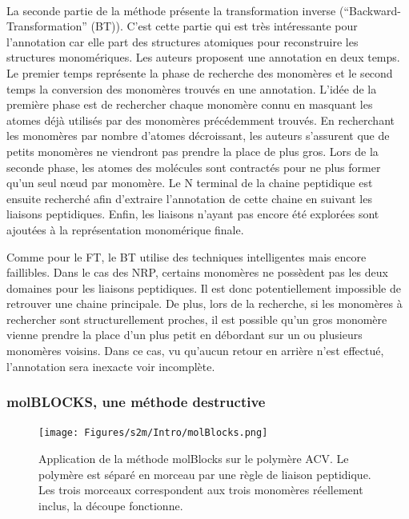 \documentclass[12pt,french,twoside]{report}
\begin{document}
\paragraph{}La seconde partie de la méthode présente la transformation inverse (``Backward-Transformation'' (BT)).
C'est cette partie qui est très intéressante pour l'annotation car elle part des structures atomiques pour reconstruire les structures monomériques.
Les auteurs proposent une annotation en deux temps.
Le premier temps représente la phase de recherche des monomères et le second temps la conversion des monomères trouvés en une annotation.
L'idée de la première phase est de rechercher chaque monomère connu en masquant les atomes déjà utilisés par des monomères précédemment trouvés.
En recherchant les monomères par nombre d'atomes décroissant, les auteurs s'assurent que de petits monomères ne viendront pas prendre la place de plus gros.
Lors de la seconde phase, les atomes des molécules sont contractés pour ne plus former qu'un seul n\oe{}ud par monomère.
Le N terminal de la chaine peptidique est ensuite recherché afin d'extraire l'annotation de cette chaine en suivant les liaisons peptidiques.
Enfin, les liaisons n'ayant pas encore été explorées sont ajoutées à la représentation monomérique finale.

Comme pour le FT, le BT utilise des techniques intelligentes mais encore faillibles.
Dans le cas des NRP, certains monomères ne possèdent pas les deux domaines pour les liaisons peptidiques.
Il est donc potentiellement impossible de retrouver une chaine principale.
De plus, lors de la recherche, si les monomères à rechercher sont structurellement proches, il est possible qu'un gros monomère vienne prendre la place d'un plus petit en débordant sur un ou plusieurs monomères voisins.
Dans ce cas, vu qu'aucun retour en arrière n'est effectué, l'annotation sera inexacte voir incomplète.


\subsubsection{molBLOCKS, une méthode destructive}

\begin{figure}[!ht]
  \begin{center}
    \texttt{[image: Figures/s2m/Intro/molBlocks.png]}
    \caption{\label{molBlocks}Application de la méthode molBlocks sur le polymère ACV.
    Le polymère est séparé en morceau par une règle de liaison peptidique.
    Les trois morceaux correspondent aux trois monomères réellement inclus, la découpe fonctionne.}
  \end{center}
\end{figure}
\end{document}
